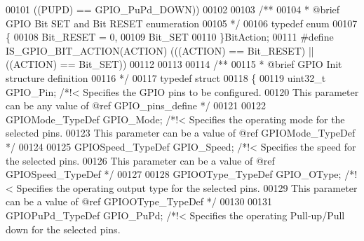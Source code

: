 \begin{DoxyCode}
00101                             \textcolor{preprocessor}{(}\textcolor{preprocessor}{(}\textcolor{preprocessor}{PUPD}\textcolor{preprocessor}{)} \textcolor{preprocessor}{==} \textcolor{preprocessor}{GPIO\_PuPd\_DOWN}\textcolor{preprocessor}{)}\textcolor{preprocessor}{)}
00102 
00103 \textcolor{comment}{/** }
00104 \textcolor{comment}{  * @brief  GPIO Bit SET and Bit RESET enumeration }
00105 \textcolor{comment}{  */}
00106 \textcolor{keyword}{typedef} \textcolor{keyword}{enum}
00107 \{
00108   Bit_RESET = 0,
00109   Bit_SET
00110 \}BitAction;
00111 \textcolor{preprocessor}{#}\textcolor{preprocessor}{define} \textcolor{preprocessor}{IS\_GPIO\_BIT\_ACTION}\textcolor{preprocessor}{(}\textcolor{preprocessor}{ACTION}\textcolor{preprocessor}{)} \textcolor{preprocessor}{(}\textcolor{preprocessor}{(}\textcolor{preprocessor}{(}\textcolor{preprocessor}{ACTION}\textcolor{preprocessor}{)} \textcolor{preprocessor}{==} \textcolor{preprocessor}{Bit\_RESET}\textcolor{preprocessor}{)} \textcolor{preprocessor}{||} \textcolor{preprocessor}{(}\textcolor{preprocessor}{(}\textcolor{preprocessor}{ACTION}\textcolor{preprocessor}{)} \textcolor{preprocessor}{==} \textcolor{preprocessor}{Bit\_SET}\textcolor{preprocessor}{)}\textcolor{preprocessor}{)}
00112 
00113 
00114 \textcolor{comment}{/** }
00115 \textcolor{comment}{  * @brief   GPIO Init structure definition  }
00116 \textcolor{comment}{  */}
00117 \textcolor{keyword}{typedef} \textcolor{keyword}{struct}
00118 \{
00119   uint32\_t GPIO_Pin;              \textcolor{comment}{/*!< Specifies the GPIO pins to be configured.}
00120 \textcolor{comment}{                                       This parameter can be any value of @ref GPIO\_pins\_define */}
00121 
00122   GPIOMode\_TypeDef GPIO_Mode;     \textcolor{comment}{/*!< Specifies the operating mode for the selected pins.}
00123 \textcolor{comment}{                                       This parameter can be a value of @ref GPIOMode\_TypeDef */}
00124 
00125   GPIOSpeed\_TypeDef GPIO_Speed;   \textcolor{comment}{/*!< Specifies the speed for the selected pins.}
00126 \textcolor{comment}{                                       This parameter can be a value of @ref GPIOSpeed\_TypeDef */}
00127 
00128   GPIOOType\_TypeDef GPIO_OType;   \textcolor{comment}{/*!< Specifies the operating output type for the selected pins.}
00129 \textcolor{comment}{                                       This parameter can be a value of @ref GPIOOType\_TypeDef */}
00130 
00131   GPIOPuPd\_TypeDef GPIO_PuPd;     \textcolor{comment}{/*!< Specifies the operating Pull-up/Pull down for the selected
       pins.}

\end{DoxyCode}

